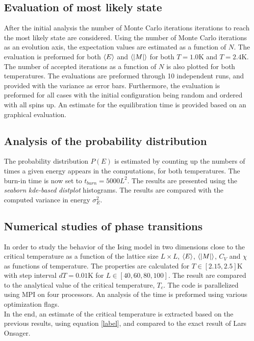 \documentclass[%
reprint,nofootinbib,
amsmath,amssymb,
aps,
]{revtex4-1}
\begin{document}
\subsection*{Evaluation of most likely state} \noindent 
After the initial analysis the number of Monte Carlo iterations iterations to reach the most likely state are considered. Using the number of Monte Carlo iterations as an evolution axis, the expectation values are estimated as a function of $N$. The evaluation is preformed for both $\expval{E}$ and $\expval{\abs{M}}$ for both $T = 1.0$K and $T = 2.4$K. The number of accepted iterations as a function of $N$ is also plotted for both temperatures. The evaluations are preformed through 10 independent runs, and provided with the variance as error bars. Furthermore, the evaluation is preformed for all cases with the initial configuration being random and ordered with all spins up. An estimate for the equilibration time is provided based on an graphical evaluation. 

\subsection*{Analysis of the probability distribution} \noindent
The probability distribution $P(E)$ is estimated by counting up the numbers of times a given energy appears in the computations, for both temperatures. The burn-in time is now set to $t_{burn} = 5000L^2$. The results are presented using the \textit{seaborn kde-based distplot} histograms. The results are compared with the computed variance in energy $\sigma_E^2$.

\subsection{Numerical studies of phase transitions}
In order to study the behavior of the Ising model in two dimensions close to the critical temperature as a function of the lattice size $L\times L$, $\expval{E}$, $\expval{\abs{M}}$, $C_V$ and $\chi$ as functions of temperature. The properties are calculated for $T\in[2.15,2.5]$K with step interval $dT = 0.01$K for $L\in[40, 60, 80, 100]$. The result are compared to the analytical value of the critical temperature, $T_c$. The code is parallelized using MPI on four processors. An analysis of the time is preformed using various optimization flags. \\ 
In the end, an estimate of the critical temperature is extracted based on the previous results, using equation \ref{label}, and compared to the exact result of Lars Onsager. 
 
\end{document}
